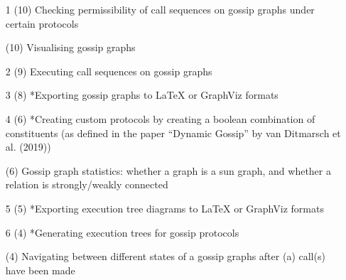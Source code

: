 \begin{enumerate}
    \item[1] (10) Checking permissibility of call sequences on gossip graphs under certain protocols	
    \item[ ] (10) Visualising gossip graphs	
    \item[2] (9)  Executing call sequences on gossip graphs	
    \item[3] (8)  *Exporting gossip graphs to LaTeX or GraphViz formats	
    \item[4] (6)  *Creating custom protocols by creating a boolean combination of constituents (as defined in the paper ``Dynamic Gossip'' by van Ditmarsch et al. (2019))	
    \item[ ] (6)  Gossip graph statistics: whether a graph is a sun graph, and whether a relation is strongly/weakly connected	
    \item[5] (5)  *Exporting execution tree diagrams to LaTeX or GraphViz formats	
    \item[6] (4)  *Generating execution trees for gossip protocols	
    \item[ ] (4)  Navigating between different states of a gossip graphs after (a) call(s) have been made
\end{enumerate}